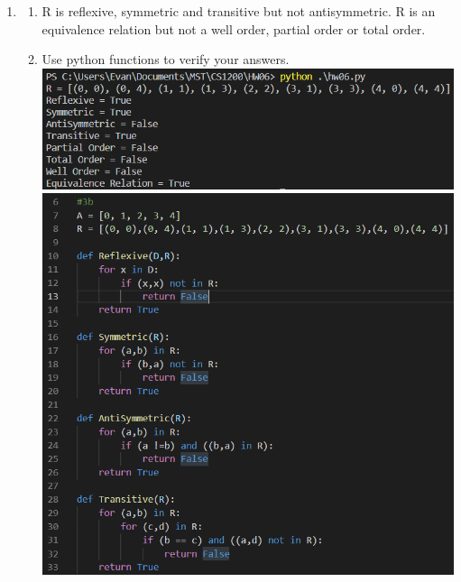 \documentclass{article}
\begin{document}
\begin{enumerate}
    
    \item 
    \begin{enumerate}
        \item R is reflexive, symmetric and transitive but not antisymmetric.
        R is an equivalence relation but not a well order, partial order or 
        total order.

        \item Use python functions to verify your answers.\\
        \includegraphics[scale=0.6]{3b3}\\
        \includegraphics[scale=0.6]{3b1}\\

\end{enumerate}
\end{enumerate}
\end{document}
